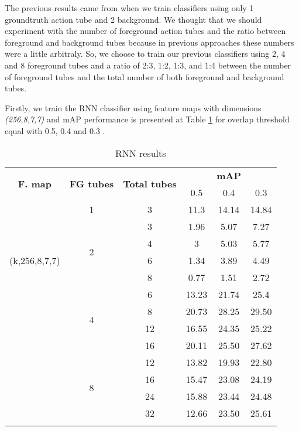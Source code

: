 The previous results came from when we train classifiers using only 1 groundtruth action tube and 2 background. We thought that we should
experiment with the number of foreground action tubes and the ratio between foreground and background tubes because in previous approaches
these numbers were a little arbitraly. So, we choose to train our previous classifiers using 2, 4 and 8 foreground tubes and a ratio of 2:3,
1:2, 1:3, and 1:4 between the number of foreground tubes and the total number of both foreground and background tubes. \par

Firstly, we train the RNN classifier using feature maps with dimensions \textit{(256,8,7,7)} and mAP performance is presented at Table 
\ref{table:rnn_increased} for overlap threshold equal with 0.5, 0.4 and 0.3 . 

\begin{center}
  \begin{longtable}{|| c | c | c || c c c||}
    \hline
    \multirow{2}{*}{\textbf{F. map}} & \multirow{2}{*}{\textbf{FG tubes}}  & \multirow{2}{*}{\textbf{Total tubes}} & {} & \textbf{mAP} & {} \\
    {}  & {} & {} & 0.5 & 0.4 & 0.3 \\
    \hline
    \multirow{7}{*}{(k,256,8,7,7)} & 1 & 3 & 11.3 & 14.14 & 14.84 \\
    \cline{2-6}
    {} & \multirow{4}{*}{2} & 3 & 1.96 & 5.07 & 7.27 \\
    \cline{3-6}
    {} & {} & 4  & 3 & 5.03 & 5.77 \\
    \cline{3-6}
    {} & {} & 6 & 1.34 & 3.89 & 4.49 \\
    \cline{3-6}
    {} & {} & 8 & 0.77 & 1.51 & 2.72 \\
    \cline{2-6}
    {} & \multirow{4}{*}{4} &  6 & 13.23 & 21.74 & 25.4 \\
    \cline{3-6}
    {} & {} & 8 & 20.73 & 28.25 & 29.50 \\
    \cline{3-6}
    {} & {} & 12  & 16.55 & 24.35 & 25.22 \\
    \cline{3-6}
    {} & {} & 16  & 20.11 & 25.50 & 27.62 \\
    \cline{2-6}
    {} & \multirow{4}{*}{8} & 12 & 13.82 & 19.93 & 22.80 \\
    \cline{3-6}
    {} &  {} & 16 & 15.47 & 23.08 & 24.19 \\
    \cline{3-6}
    {} &  {} & 24 & 15.88 & 23.44 & 24.48  \\
    \cline{3-6}
    {} &  {} & 32 &  12.66 & 23.50 & 25.61 \\
    \hline

  \caption{RNN results }
  \label{table:rnn_increased}
\end{longtable}
\end{center}


